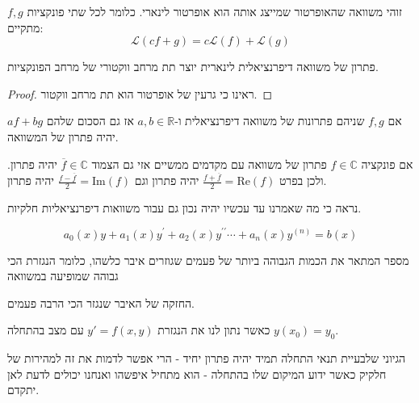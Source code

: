 \documentclass{tstextbook}
\begin{document}
\begin{definition}
זוהי משוואה שהאופרטור שמייצג אותה הוא אופרטור לינארי. כלומר לכל שתי פונקציות \(f,g\) מתקיים:
$$\mathcal{L}(cf+g)=c\mathcal{L}(f)+\mathcal{L}(g)$$

\end{definition}
\begin{proposition}
פתרון של משוואה דיפרנציאלית לינארית יוצר תת מרחב ווקטורי של מרחב הפונקציות.

\end{proposition}
\begin{proof}
ראינו כי גרעין של אופרטור הוא תת מרחב ווקטור.

\end{proof}
\begin{corollary}
אם \(f,g\) שניהם פתרונות של משוואה דיפרנציאלית ו-\(a,b \in \mathbb{R}\) אז גם הסכום שלהם \(af+bg\) יהיה פתרון של המשוואה.

\end{corollary}
\begin{proposition}
אם פונקציה \(f \in \mathbb{C}\) פתרון של משוואה עם מקדמים ממשיים אזי גם הצמוד \(\overline{f}\in \mathbb{C}\) יהיה פתרון. ולכן בפרט \(\frac{f+\overline{f}}{2}=\mathrm{Re}(f)\) יהיה פתרון וגם \(\frac{f-\overline{f}}{2}=\mathrm{Im}(f)\) יהיה פתרון.

\end{proposition}
\begin{remark}
נראה כי מה שאמרנו עד עכשיו יהיה נכון גם עבור משוואות דיפרנציאליות חלקיות.

\end{remark}
\begin{proposition}
$$a_{0}(x)y+a_{1}(x)y^{\prime}+a_{2}(x)y^{\prime\prime}\cdots+a_{n}(x)y^{(n)}=b(x)$$

\end{proposition}
\begin{definition}
מספר המתאר את הכמות הגבוהה ביותר של פעמים שגוזרים איבר כלשהו, כלומר הנגזרת הכי גבוהה שמופיעה במשוואה

\end{definition}
\begin{definition}
החזקה של האיבר שנגזר הכי הרבה פעמים.

\end{definition}
\begin{definition}
כאשר נתון לנו את הנגזרת \(y'=f(x,y)\) עם מצב בהתחלה \(y(x_{0})=y_{0}\).

\end{definition}
הגיוני שלבעיית תנאי התחלה תמיד יהיה פתרון יחיד - הרי אפשר לדמות את זה למהירות של חלקיק כאשר ידוע המיקום שלו בהתחלה - הוא מתחיל איפשהו ואנחנו יכולים לדעת לאן יתקדם.
\end{document}
